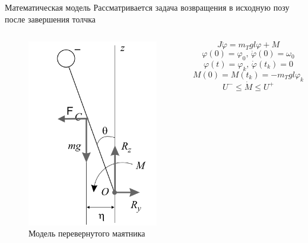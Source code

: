 \documentclass[10pt]{beamer}
\begin{document}
\begin{frame}{Математическая модель}
	Рассматривается задача возвращения в исходную позу после завершения толчка
	\begin{columns}
		\begin{figure}[h!]
			\includegraphics[width=0.6\linewidth]{images_pres/body_1.png}
			\caption{Модель перевернутого маятника}
		\end{figure}

		\[
			J\ddot{\varphi}=m_Tgl\varphi+M
		\]
		\[
			\varphi(0)=\varphi_0,\, \dot{\varphi}(0)=\omega_0
		\]
		\[
			\varphi(t)=\varphi_k,\, \dot{\varphi}(t_k)=0
		\]
		\[
			M(0)=M(t_k)=-m_Tgl\varphi_k
		\]
		\[
			U^-\leq\dot{M}\leq U^+
		\]
	\end{columns}
\end{frame}
\end{document}
